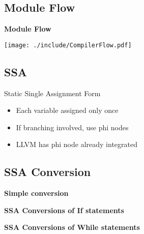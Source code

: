 \documentclass{beamer}
\begin{document}
\subsection{Module Flow}

\begin{frame}{\bf Module Flow}
  \begin{center}
    \texttt{[image: ./include/CompilerFlow.pdf]}
  \end{center}
\end{frame}


\subsection{SSA}

\begin{frame}{Static Single Assignment Form}
  \begin{itemize}
  \item<1->Each variable assigned only once
  \item<2->If branching involved, use phi nodes
  \item<3->LLVM has phi node already integrated
  \end{itemize}
\end{frame}

\subsection{SSA Conversion}

\begin{frame}{\bf Simple conversion}
  
\pause
  
\end{frame}

\begin{frame}[shrink]{\bf SSA Conversions of If statements}
  
\pause
  
\end{frame}

\begin{frame}[shrink]{\bf SSA Conversions of While statements}
  
\pause
  
\end{frame}
\end{document}
